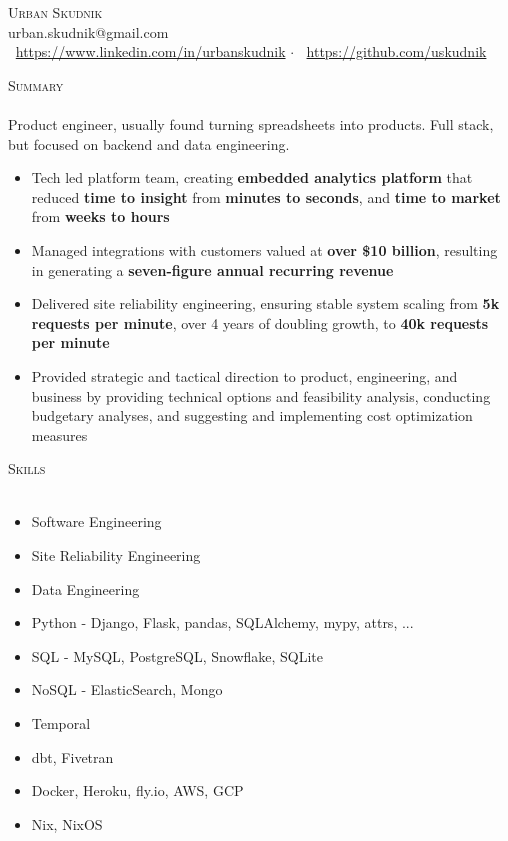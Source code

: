 \documentclass[a4paper]{article}
\newcommand{\lineunder} {
    \vspace*{-8pt} \\
    \hspace*{-18pt} {\color{Mahogany} \hrulefill} \\
}
\newcommand{\header} [1] {
    \vspace{4mm}
    {\hspace*{-18pt}\vspace*{6pt} \large \textsc{\textcolor{Mahogany}{#1}}}
    \vspace*{-6pt} \lineunder
}
\begin{document}
\vspace*{-40pt}



\vspace*{-10pt}
\begin{center}
	{\Huge \scshape {Urban Skudnik}}\\
    \vspace{2mm}
	urban.skudnik@gmail.com\\
    \vspace{2mm}
    \faLinkedinSquare  $\>$ \url{https://www.linkedin.com/in/urbanskudnik} $\cdot$
    \faGithub $\>$ \url{https://github.com/uskudnik}\\
\end{center}

\header{Summary}
Product engineer, usually found turning spreadsheets into products. Full stack, but focused on backend and data engineering.

\begin{itemize} \itemsep 1pt
\item Tech led platform team, creating \textbf{embedded analytics platform} that reduced \textbf{time to insight} from \textbf{minutes to seconds}, and \textbf{time to market} from \textbf{weeks to hours}
\item Managed integrations with customers valued at \textbf{over \$10 billion}, resulting in generating a \textbf{seven-figure annual recurring revenue}
\item Delivered site reliability engineering, ensuring stable system scaling from \textbf{5k requests per minute}, over 4 years of doubling growth, to \textbf{40k requests per minute}
\item Provided strategic and tactical direction to product, engineering, and business by providing technical options and feasibility analysis, conducting budgetary analyses, and suggesting and implementing cost optimization measures
\end{itemize}


\header{Skills}
\begin{itemize} \itemsep 1pt
    \item Software Engineering
    \item Site Reliability Engineering
    \item Data Engineering
    \item Python - Django, Flask, pandas, SQLAlchemy, mypy, attrs, ...
    \item SQL - MySQL, PostgreSQL, Snowflake, SQLite
    \item NoSQL - ElasticSearch, Mongo
    \item Temporal
    \item dbt, Fivetran
    \item Docker, Heroku, fly.io, AWS, GCP
    \item Nix, NixOS
\end{itemize}
\end{document}
